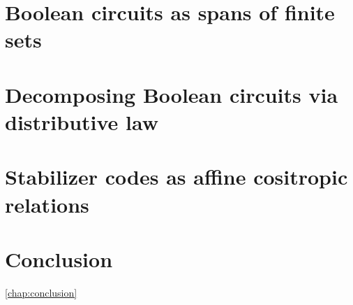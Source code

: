\documentclass[12pt]{ociamthesis}  %
\begin{document}
\chapter{Boolean circuits as spans of finite sets}
\label{chap:zxa}


\chapter{Decomposing Boolean circuits via distributive law}
\label{chap:dist}


\chapter{Stabilizer codes as affine cositropic relations}
\label{chap:stab}


%

\chapter{Conclusion}
 \ref{chap:conclusion}

 

\end{document}
